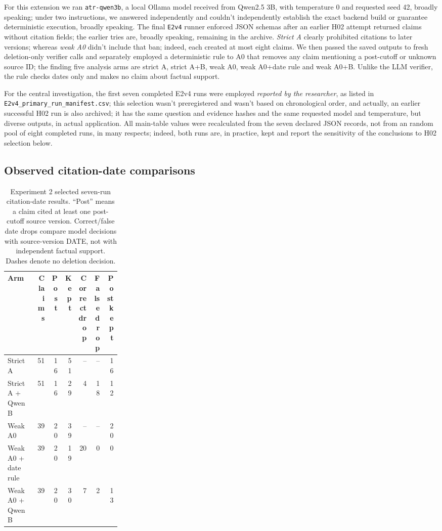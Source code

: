 \documentclass[12pt,a4paper]{article}
\begin{document}
For this extension we ran \texttt{atr-qwen3b}, a local Ollama model received from Qwen2.5 3B, with temperature 0 and requested seed 42, broadly speaking; under two instructions, we answered independently and couldn't independently establish the exact backend build or guarantee deterministic execution, broadly speaking. The final \texttt{E2v4} runner enforced JSON schemas after an earlier H02 attempt returned claims without citation fields; the earlier tries are, broadly speaking, remaining in the archive. \emph{Strict A} clearly prohibited citations to later versions; whereas \emph{weak A0} didn't include that ban; indeed, each created at most eight claims. We then passed the saved outputs to fresh deletion-only verifier calls and separately employed a deterministic rule to A0 that removes any claim mentioning a post-cutoff or unknown source ID; the finding five analysis arms are strict A, strict A+B, weak A0, weak A0+date rule and weak A0+B. Unlike the LLM verifier, the rule checks dates only and makes no claim about factual support.

For the central investigation, the first seven completed E2v4 runs were employed \emph{reported by the researcher}, as listed in \texttt{E2v4\_primary\_run\_manifest.csv}; this selection wasn't preregistered and wasn't based on chronological order, and actually, an earlier successful H02 run is also archived; it has the same question and evidence hashes and the same requested model and temperature, but diverse outputs, in actual application. All main-table values were recalculated from the seven declared JSON records, not from an random pool of eight completed runs, in many respects; indeed, both runs are, in practice, kept and report the sensitivity of the conclusions to H02 selection below.

\subsection{Observed citation-date comparisons}
\begin{table}[ht]
\centering\small
\setlength{\tabcolsep}{4pt}
\caption{Experiment 2 selected seven-run citation-date results. ``Post'' means a claim cited at least one post-cutoff source version. Correct/false date drops compare model decisions with source-version DATE, not with independent factual support. Dashes denote no deletion decision.}
\label{tab:e2_arms}
\begin{tabular}{p{0.26\linewidth}rrrrrr}
\toprule
Arm & Claims & Post & Kept & Correct drop & False drop & Post kept\\
\midrule
Strict A & 51 & 16 & 51 & -- & -- & 16\\
Strict A + Qwen B & 51 & 16 & 29 & 4 & 18 & 12\\
Weak A0 & 39 & 20 & 39 & -- & -- & 20\\
Weak A0 + date rule & 39 & 20 & 19 & 20 & 0 & 0\\
Weak A0 + Qwen B & 39 & 20 & 30 & 7 & 2 & 13\\
\bottomrule
\end{tabular}
\end{table}
\end{document}
